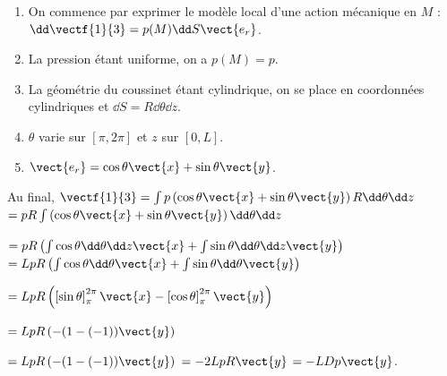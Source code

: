 \ifprof
\begin{corrige}
\begin{enumerate}
\item On commence par exprimer le modèle local d'une action mécanique en $M$ : $\dd \vectf{1}{3} = p(M) \dd S \vect{e_r}$.
\item La pression étant uniforme, on a $p(M)=p$.
\item La géométrie du coussinet étant cylindrique, on se place en coordonnées cylindriques et $\dd S = R\dd \theta \dd z$.  
\item $\theta$ varie sur $[\pi, 2\pi]$ et $z$ sur $[0,L]$. 
\item $\vect{e_r}=\cos\theta\vect{x}+\sin\theta\vect{y}$.
\end{enumerate}
Au final, $\vectf{1}{3}=\int p  \left( \cos\theta\vect{x}+\sin\theta\vect{y}\right)R\dd \theta \dd z$
$=pR\int \left( \cos\theta\vect{x}+\sin\theta\vect{y}\right)\dd \theta \dd z$

$=pR\left( \int  \cos\theta\dd \theta \dd z \vect{x}+\int \sin\theta\dd \theta \dd z   \vect{y}\right)$
$=LpR\left( \int  \cos\theta\dd \theta  \vect{x}+\int \sin\theta\dd \theta   \vect{y}\right)$

$=LpR\left( \left[ \sin \theta \right]^{2\pi}_{\pi}  \vect{x}-\left[\cos \theta \right]^{2\pi}_{\pi}   \vect{y}\right)$

$=LpR\left( -(1-(-1))   \vect{y}\right)$

$=LpR\left( -(1-(-1))   \vect{y}\right)$ $=-2LpR   \vect{y}$ $=-LDp   \vect{y}$.

\end{corrige}
\else
\fi


\ifcolle
\else
\ifprof
\else
{}
\fi
\fi


